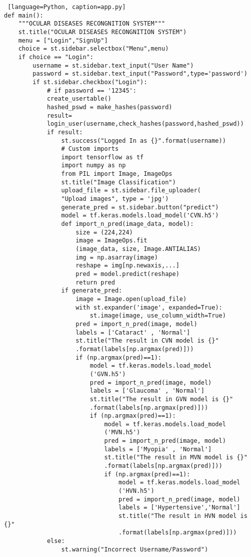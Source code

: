 \begin{lstlisting} [language=Python, caption=app.py]
def main():
    """OCULAR DISEASES RECONGNITION SYSTEM"""
    st.title("OCULAR DISEASES RECONGNITION SYSTEM")
    menu = ["Login","SignUp"]
    choice = st.sidebar.selectbox("Menu",menu)
    if choice == "Login":
        username = st.sidebar.text_input("User Name")
        password = st.sidebar.text_input("Password",type='password')
        if st.sidebar.checkbox("Login"):
            # if password == '12345':
            create_usertable()
            hashed_pswd = make_hashes(password)
            result= 
            login_user(username,check_hashes(password,hashed_pswd))
            if result:
                st.success("Logged In as {}".format(username))
                # Custom imports 
                import tensorflow as tf
                import numpy as np
                from PIL import Image, ImageOps
                st.title("Image Classification")
                upload_file = st.sidebar.file_uploader(
                "Upload images", type = 'jpg')
                generate_pred = st.sidebar.button("predict")
                model = tf.keras.models.load_model('CVN.h5')
                def import_n_pred(image_data, model):
                    size = (224,224)
                    image = ImageOps.fit
                    (image_data, size, Image.ANTIALIAS)
                    img = np.asarray(image)
                    reshape = img[np.newaxis,...]
                    pred = model.predict(reshape)
                    return pred
                if generate_pred:
                    image = Image.open(upload_file)
                    with st.expander('image', expanded=True):
                        st.image(image, use_column_width=True)
                    pred = import_n_pred(image, model)
                    labels = ['Cataract' , 'Normal']
                    st.title("The result in CVN model is {}"
                    .format(labels[np.argmax(pred)]))
                    if (np.argmax(pred)==1):
                        model = tf.keras.models.load_model
                        ('GVN.h5')
                        pred = import_n_pred(image, model)
                        labels = ['Glaucoma' , 'Normal']
                        st.title("The result in GVN model is {}"
                        .format(labels[np.argmax(pred)]))
                        if (np.argmax(pred)==1):
                            model = tf.keras.models.load_model
                            ('MVN.h5')
                            pred = import_n_pred(image, model)
                            labels = ['Myopia' , 'Normal']
                            st.title("The result in MVN model is {}"
                            .format(labels[np.argmax(pred)]))
                            if (np.argmax(pred)==1):
                                model = tf.keras.models.load_model
                                ('HVN.h5')
                                pred = import_n_pred(image, model)
                                labels = ['Hypertensive','Normal']
                                st.title("The result in HVN model is {}"
                                .format(labels[np.argmax(pred)]))
            else:
                st.warning("Incorrect Username/Password")


\end{lstlisting}
